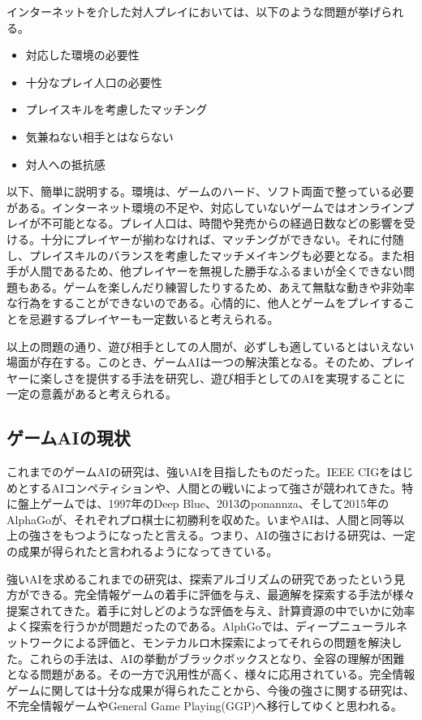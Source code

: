 \documentclass[12pt]{jsarticle}
\begin{document}
インターネットを介した対人プレイにおいては、以下のような問題が挙げられる。
\begin{itemize}
\item 対応した環境の必要性
\item 十分なプレイ人口の必要性
\item プレイスキルを考慮したマッチング
\item 気兼ねない相手とはならない
\item 対人への抵抗感
\end{itemize}
以下、簡単に説明する。環境は、ゲームのハード、ソフト両面で整っている必要がある。インターネット環境の不足や、対応していないゲームではオンラインプレイが不可能となる。プレイ人口は、時間や発売からの経過日数などの影響を受ける。十分にプレイヤーが揃わなければ、マッチングができない。それに付随し、プレイスキルのバランスを考慮したマッチメイキングも必要となる。また相手が人間であるため、他プレイヤーを無視した勝手なふるまいが全くできない問題もある。ゲームを楽しんだり練習したりするため、あえて無駄な動きや非効率な行為をすることができないのである。心情的に、他人とゲームをプレイすることを忌避するプレイヤーも一定数いると考えられる。

以上の問題の通り、遊び相手としての人間が、必ずしも適しているとはいえない場面が存在する。このとき、ゲームAIは一つの解決策となる。そのため、プレイヤーに楽しさを提供する手法を研究し、遊び相手としてのAIを実現することに一定の意義があると考えられる。

\subsection{ゲームAIの現状}
これまでのゲームAIの研究は、強いAIを目指したものだった。IEEE CIGをはじめとするAIコンペティション\cite{cig}や、人間との戦いによって強さが競われてきた。特に盤上ゲームでは、1997年のDeep Blue、2013のponannza、そして2015年のAlphaGo\cite{alphaGo}が、それぞれプロ棋士に初勝利を収めた。いまやAIは、人間と同等以上の強さをもつようになったと言える。つまり、AIの強さにおける研究は、一定の成果が得られたと言われるようになってきている。

強いAIを求めるこれまでの研究は、探索アルゴリズムの研究であったという見方ができる。完全情報ゲームの着手に評価を与え、最適解を探索する手法が様々提案されてきた。着手に対しどのような評価を与え、計算資源の中でいかに効率よく探索を行うかが問題だったのである。AlphGoでは、ディープニューラルネットワークによる評価と、モンテカルロ木探索によってそれらの問題を解決した。これらの手法は、AIの挙動がブラックボックスとなり、全容の理解が困難となる問題がある。その一方で汎用性が高く、様々に応用されている\cite{NE, monte}。完全情報ゲームに関しては十分な成果が得られたことから、今後の強さに関する研究は、不完全情報ゲームやGeneral Game Playing(GGP)へ移行してゆくと思われる。
\end{document}
